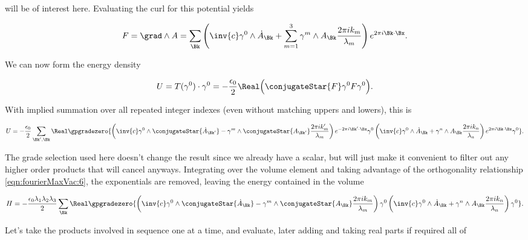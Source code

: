 will be of interest here.  Evaluating the curl for this potential yields

\begin{align}\label{eqn:fourierMaxVac:8}
F = \grad \wedge A
= \sum_{\Bk} \left( \inv{c} \gamma^0 \wedge \dot{A}_\Bk + \sum_{m=1}^3 \gamma^m \wedge A_\Bk \frac{2 \pi i k_m}{\lambda_m} \right) e^{2 \pi i \Bk \cdot \Bx}.
\end{align}

We can now form the energy density

\begin{align}\label{eqn:fourierMaxVac:9}
U = T(\gamma^0) \cdot \gamma^0
=
-\frac{\epsilon_0}{2} \Real \Bigl( \conjugateStar{F} \gamma^0 F \gamma^0 \Bigr).
\end{align}

With implied summation over all repeated integer indexes (even without matching uppers and lowers), this is

\begin{align}\label{eqn:fourierMaxVac:10}
U =
-\frac{\epsilon_0}{2} \sum_{\Bk', \Bk} \Real \gpgradezero{
\left( \inv{c} \gamma^0 \wedge \conjugateStar{\dot{A}_{\Bk'}} - \gamma^m \wedge \conjugateStar{A_{\Bk'}} \frac{2 \pi i k_m'}{\lambda_m} \right) e^{-2 \pi i \Bk' \cdot \Bx}
\gamma^0
\left( \inv{c} \gamma^0 \wedge \dot{A}_\Bk + \gamma^n \wedge A_\Bk \frac{2 \pi i k_n}{\lambda_n} \right) e^{2 \pi i \Bk \cdot \Bx}
\gamma^0
}.
\end{align}

The grade selection used here doesn't change the result since we already have a scalar, but will just make it convenient to filter out any higher order products that will cancel anyways.  Integrating over the volume element and taking advantage of the orthogonality relationship \ref{eqn:fourierMaxVac:6}, the exponentials are removed, leaving the energy contained in the volume

\begin{align}\label{eqn:fourierMaxVac:11}
H = %
-\frac{\epsilon_0 \lambda_1 \lambda_2 \lambda_3}{2}
\sum_{\Bk} \Real 
\gpgradezero{
\left( \inv{c} \gamma^0 \wedge \conjugateStar{\dot{A}_{\Bk}} - \gamma^m \wedge \conjugateStar{A_{\Bk}} \frac{2 \pi i k_m}{\lambda_m} \right) 
\gamma^0
\left( \inv{c} \gamma^0 \wedge \dot{A}_\Bk + \gamma^n \wedge A_\Bk \frac{2 \pi i k_n}{\lambda_n} \right) 
\gamma^0
}.
\end{align}

Let's take the products involved in sequence one at a time, and evaluate, later adding and taking real parts if required all of

